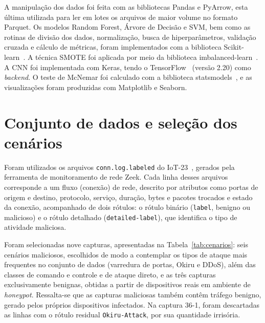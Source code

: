A manipulação dos dados foi feita com as bibliotecas Pandas e PyArrow, esta última utilizada para ler em lotes os arquivos de maior volume no formato Parquet. Os modelos Random Forest, Árvore de Decisão e SVM, bem como as rotinas de divisão dos dados, normalização, busca de hiperparâmetros, validação cruzada e cálculo de métricas, foram implementados com a biblioteca Scikit-learn~\cite{pedregosa2011scikit}. A técnica SMOTE foi aplicada por meio da biblioteca imbalanced-learn~\cite{lemaitre2017imbalanced}. A CNN foi implementada com Keras, tendo o TensorFlow~\cite{abadi2016tensorflow} (versão 2.20) como \textit{backend}. O teste de McNemar foi calculado com a biblioteca statsmodels~\cite{seabold2010statsmodels}, e as visualizações foram produzidas com Matplotlib e Seaborn.

\section{Conjunto de dados e seleção dos cenários}
\label{sec:cenarios}

Foram utilizados os arquivos \texttt{conn.log.labeled} do IoT-23~\cite{garcia2020iot23}, gerados pela ferramenta de monitoramento de rede Zeek. Cada linha desses arquivos corresponde a um fluxo (conexão) de rede, descrito por atributos como portas de origem e destino, protocolo, serviço, duração, bytes e pacotes trocados e estado da conexão, acompanhado de dois rótulos: o rótulo binário (\texttt{label}, benigno ou malicioso) e o rótulo detalhado (\texttt{detailed-label}), que identifica o tipo de atividade maliciosa.

Foram selecionadas nove capturas, apresentadas na Tabela~\ref{tab:cenarios}: seis cenários maliciosos, escolhidos de modo a contemplar os tipos de ataque mais frequentes no conjunto de dados (varredura de portas, Okiru e DDoS), além das classes de comando e controle e de ataque direto, e as três capturas exclusivamente benignas, obtidas a partir de dispositivos reais em ambiente de \textit{honeypot}. Ressalta-se que as capturas maliciosas também contêm tráfego benigno, gerado pelos próprios dispositivos infectados. Na captura 36-1, foram descartadas as linhas com o rótulo residual \texttt{Okiru-Attack}, por sua quantidade irrisória.

